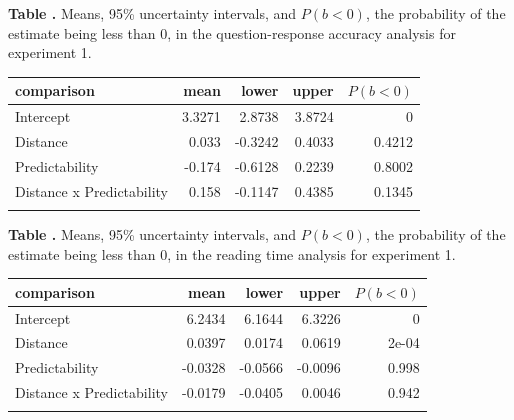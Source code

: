 \documentclass{frontiersSCNS}\usepackage{knitr} %
\begin{document}
\begin{table}[!htbp]
\textbf{\label{Tab:01q} Table . }{Means, 95\% uncertainty intervals, and $P(b<0)$, the probability of the estimate being less than 0, in the question-response accuracy analysis for experiment 1.}
\processtable{}
{\begin{tabular}{lrrrr}\toprule
comparison & mean & lower & upper & $P(b<0)$ \\
\midrule   
Intercept  & 3.3271 & 2.8738 & 3.8724 & 0\\
Distance  & 0.033 & -0.3242 & 0.4033 & 0.4212\\
Predictability  & -0.174 & -0.6128 & 0.2239 & 0.8002\\
Distance x Predictability  & 0.158 & -0.1147 & 0.4385 & 0.1345\\
\botrule
\end{tabular}}{}
\end{table}

\begin{table}[!htbp]
\textbf{\label{Tab:01} Table . }{Means, 95\% uncertainty intervals, and $P(b<0)$, the probability of the estimate being less than 0, in the reading time analysis for experiment 1.}
\processtable{}
{\begin{tabular}{lrrrr}\toprule
comparison & mean & lower & upper & $P(b<0)$ \\
\midrule   
Intercept  & 6.2434 & 6.1644 & 6.3226 & 0\\
Distance  & 0.0397 & 0.0174 & 0.0619 & 2e-04\\
Predictability  & -0.0328 & -0.0566 & -0.0096 & 0.998\\
Distance x Predictability  & -0.0179 & -0.0405 & 0.0046 & 0.942\\
\botrule
\end{tabular}}{}
\end{table}
\end{document}
